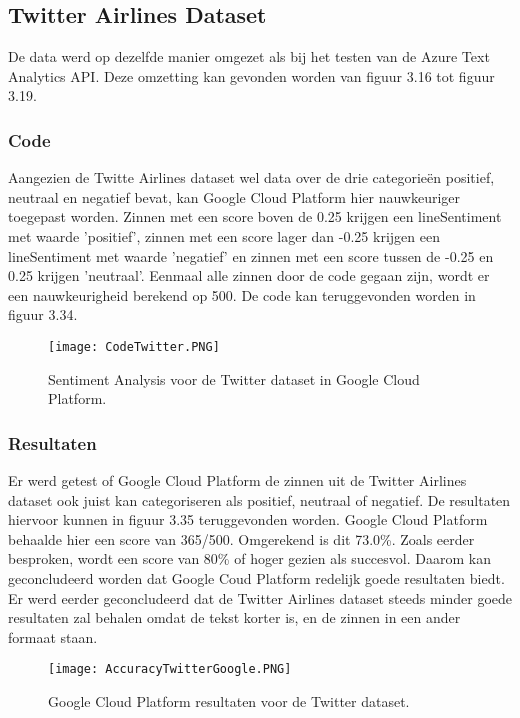 \subsection{Twitter Airlines Dataset}
\label{twittergoogleplatform}

De data werd op dezelfde manier omgezet als bij het testen van de Azure Text Analytics API. Deze omzetting kan gevonden worden van figuur 3.16 tot figuur 3.19.

\subsubsection{Code}
\label{twittercodegoogleplatform}
Aangezien de Twitte Airlines dataset wel data over de drie categorieën positief, neutraal en negatief bevat, kan Google Cloud Platform hier nauwkeuriger toegepast worden. Zinnen met een score boven de 0.25 krijgen een lineSentiment met waarde 'positief', zinnen met een score lager dan -0.25 krijgen een lineSentiment met waarde 'negatief' en zinnen met een score tussen de -0.25 en 0.25 krijgen 'neutraal'. Eenmaal alle zinnen door de code gegaan zijn, wordt er een nauwkeurigheid berekend op 500. De code kan teruggevonden worden in figuur 3.34.

\begin{figure}[!htbp]
    \texttt{[image: CodeTwitter.PNG]}
    \caption{\label{codetwitter}Sentiment Analysis voor de Twitter dataset in Google Cloud Platform.}
\end{figure}
\FloatBarrier 

\subsubsection{Resultaten}
\label{twitterresultatengoogleplatform}
Er werd getest of Google Cloud Platform de zinnen uit de Twitter Airlines dataset ook juist kan categoriseren als positief, neutraal of negatief. De resultaten hiervoor kunnen in figuur 3.35 teruggevonden worden. Google Cloud Platform behaalde hier een score van 365/500. Omgerekend is dit 73.0\%. Zoals eerder besproken, wordt een score van 80\% of hoger gezien als succesvol. Daarom kan geconcludeerd worden dat Google Coud Platform redelijk goede resultaten biedt. Er werd eerder geconcludeerd dat de Twitter Airlines dataset steeds minder goede resultaten zal behalen omdat de tekst korter is, en de zinnen in een ander formaat staan. 

\begin{figure}[!htbp]
    \texttt{[image: AccuracyTwitterGoogle.PNG]}
    \caption{\label{accuracytwitter}Google Cloud Platform resultaten voor de Twitter dataset.}
\end{figure}
\FloatBarrier 


